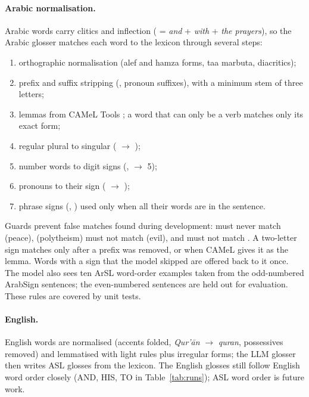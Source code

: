 \paragraph{Arabic normalisation.} Arabic words carry clitics and inflection ( = \emph{and} + \emph{with}
+ \emph{the prayers}), so the Arabic glosser matches each word to the lexicon through several steps:
\begin{enumerate}[leftmargin=*,itemsep=1pt]
  \item orthographic normalisation (alef and hamza forms, taa marbuta, diacritics);
  \item prefix and suffix stripping (, pronoun suffixes), with a minimum stem of three letters;
  \item lemmas from CAMeL Tools \cite{camel}; a word that can only be a verb matches only its exact form;
  \item regular plural to singular ( $\rightarrow$ );
  \item number words to digit signs (,  $\rightarrow$ 5);
  \item pronouns to their sign ( $\rightarrow$ );
  \item phrase signs (, ) used only when all their words are in the sentence.
\end{enumerate}
Guards prevent false matches found during development:  must never match  (peace), 
(polytheism) must not match  (evil), and  must not match . A two-letter sign matches only
after a prefix was removed, or when CAMeL gives it as the lemma. Words with a sign that the model skipped are offered back
to it once. The model also sees ten ArSL word-order examples taken from the odd-numbered ArabSign sentences; the
even-numbered sentences are held out for evaluation. These rules are covered by unit tests.

\paragraph{English.} English words are normalised (accents folded, \emph{Qur'\=an} $\rightarrow$ \emph{quran},
possessives removed) and lemmatised with light rules plus irregular forms; the LLM glosser then writes ASL glosses from
the lexicon. The English glosses still follow English word order closely (AND, HIS, TO in Table~\ref{tab:runs});
ASL word order is future work.

